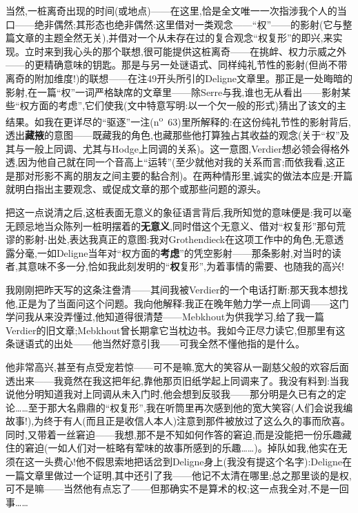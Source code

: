 当然,一桩离奇出现的时间(或地点)——在这里,恰是全文唯一一次指涉我个人的当口——绝非偶然;其形态也绝非偶然:这里借对一类观念——“权”——的影射(它与整篇文章的主题全然无关),并借对一个从未存在过的复合观念“权复形”的即兴,来实现。立时来到我心头的那个联想,很可能提供这桩离奇——在挑衅、权力示威之外——的更精确意味的钥匙。那是与另一处谜语式、同样纯礼节性的影射(但尚不带离奇的附加维度!)的联想——在注49开头所引的Deligne文章里。那正是一处晦暗的影射,在一篇“权”一词严格缺席的文章里——除Serre与我,谁也无从看出——影射某些“权方面的考虑”,它们使我(文中特意写明:以一个欠一般的形式)猜出了该文的主结果。如我在更详尽的“驱逐”一注(n\textsuperscript{o}~63)里所解释的:在这份纯礼节性的影射背后,透出\textbf{藏掖}的意图——既藏我的角色,也藏那些他打算独占其收益的观念(关于“权”及其与一般上同调、尤其与Hodge上同调的关系)。这一意图,Verdier想必领会得格外透,因为他自己\dmark{}就在同一个音高上“运转”(至少就他对我的关系而言;而依我看,这正是那对形影不离的朋友之间主要的黏合剂)。在两种情形里,诚实的做法本应是:开篇就明白指出主要观念、或促成文章的那个或那些问题的源头。

把这一点说清之后,这桩表面无意义的象征语言背后,我所知觉的意味便是:我可以毫无顾忌地当众陈列一桩明摆着的\textbf{无意义},同时借这个无意义、借对“权复形”那句荒谬的影射-出处,表达我真正的意图:我对Grothendieck在这项工作中的角色,无意透露分毫,一如Deligne当年对“权方面的\textbf{考虑}”的凭空影射——那条影射,对当时的读者,其意味不多一分,恰如我此刻发明的“\textbf{权}复形”,为着事情的需要、也随我的高兴!

我刚刚把昨天写的这条注誊清——其间我被Verdier的一个电话打断:那天我本想找他,正是为了当面问这个问题。我向他解释:我正在晚年勉力学一点上同调——这门学问我从来没弄懂过,他知道得很清楚——Mebkhout为供我学习,给了我一篇Verdier的旧文章;Mebkhout曾长期拿它当枕边书。我如今正尽力读它,但那里有这条谜语式的出处——他当然好意引我——可我全然不懂他指的是什么。

他非常高兴,甚至有点受宠若惊——可不是嘛,宽大的笑容从一副慈父般的欢容后面透出来——我竟然在我这把年纪,靠他那页旧纸学起上同调来了。我没有料到:当我说他分明知道我对上同调从未入门时,他会想到反驳我——那分明是久已有之的定论……至于那大名鼎鼎的“权复形”,我在听筒里再次感到他的宽大笑容(人们会说我编故事!),为终于有人(而且正是收信人本人)注意到那件被放过了这么久的事而欣喜。同时,又带着一丝窘迫——我想,那不是不知如何作答的窘迫,而是没能把一份乐趣\dmark{}藏住的窘迫(一如人们对一桩略有荤味的故事所感到的乐趣……)。掉队如我,他实在无须在这一头费心!他不假思索地把话岔到Deligne身上(我没有提这个名字):Deligne在一篇文章里做过一个证明,其中还引了我——他记不太清在哪里;总之那里谈的是权,可不是嘛——当然他有点忘了——但那确实不是算术的权;这一点我全对,不是一回事……


